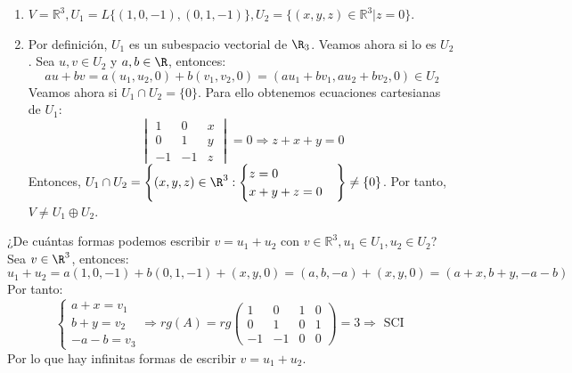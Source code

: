 \begin{ejercicio}
\begin{enumerate}
		\item \( V = \mathbb{R}^3, U_1 = L\{(1,0,-1), (0,1,-1)\}, U_2 = \{(x,y,z) \in \mathbb{R}^3 | z = 0\} \).
		\item Por definición, $U_1$ es un subespacio vectorial de $\R_3$. Veamos ahora si lo es $U_2$. Sea 
		$u, v \in U_2$ y $a, b \in \R$, entonces:
        \begin{equation*}
            au + bv = a(u_1, u_2, 0) + b(v_1, v_2, 0) = (au_1 + bv_1, au_2 + bv_2, 0) \in U_2
        \end{equation*}
        Veamos ahora si $U_1 \cap U_2 = \{0\}$. Para ello obtenemos ecuaciones cartesianas de $U_1$:
        \begin{equation*}
            \begin{vmatrix}
                1 & 0 & x \\
                0 & 1 & y \\
                -1 & -1 & z
            \end{vmatrix} = 0 \Rightarrow z + x + y = 0
        \end{equation*}
        Entonces, $U_1 \cap U_2 = \left\{ (x,y,z) \in \R^3 : \begin{cases}
            z = 0 \\
            x + y + z = 0
        \end{cases} \right\} \neq \{0\}$. Por tanto, $V \neq U_1 \oplus U_2$.
	\end{enumerate}
	¿De cuántas formas podemos escribir \( v = u_1 + u_2 \) con \( v \in \mathbb{R}^3, u_1 \in U_1, u_2 \in U_2 \)?
    Sea $v \in \R^3$, entonces: 
    \begin{equation*}
        u_1 + u_2 = a(1,0,-1) + b(0,1,-1) + (x,y,0) = (a, b, -a) + (x, y, 0) = (a + x, b + y, -a-b)
    \end{equation*}
    Por tanto:
    \begin{equation*}
        \begin{cases}
            a + x = v_1 \\
            b + y = v_2 \\
            -a - b = v_3
        \end{cases} \Rightarrow rg(A) = rg\begin{pmatrix}
            1 & 0 & 1 & 0 \\
            0 & 1 & 0 & 1 \\
            -1 & -1 & 0 & 0
        \end{pmatrix} = 3 \Rightarrow \text{ SCI }
    \end{equation*}
    Por lo que hay infinitas formas de escribir $v = u_1 + u_2$.
\end{ejercicio}




